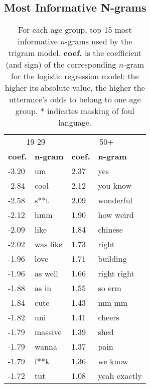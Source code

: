 \subsection{Most Informative N-grams}

\begin{table}[H]
    \centering
    \begin{tabular}{@{}l l @{\hspace*{25pt}} l l@{}}
    \toprule
    \multicolumn{2}{c}{19-29} & \multicolumn{2}{c}{50+}\\
    \textbf{coef.} & \textbf{n-gram} & \textbf{coef.} & \textbf{n-gram}\\
    \midrule
    -3.20 & um & 2.37 & yes\\
    -2.84 & cool & 2.12 & you know\\
    -2.58 & s**t & 2.09 & wonderful\\
    -2.12 & hmm & 1.90 & how weird\\
    -2.09 & like & 1.84 & chinese\\
    -2.02 & was like & 1.73 & right\\
    -1.96 & love & 1.71 & building\\
    -1.96 & as well & 1.66 & right right\\
    -1.88 & as in & 1.55 & so erm\\
    -1.84 & cute & 1.43 & mm mm\\
    -1.82 & uni & 1.41 & cheers\\
    -1.79 & massive & 1.39 & shed\\
    -1.79 & wanna & 1.37 & pain\\
    -1.79 & f**k & 1.36 & we know\\
    -1.72 & tut & 1.08 & yeah exactly\\
    \bottomrule
    \end{tabular}
    \caption{For each age group, top 15 most informative $n$-grams used by the trigram model. \textbf{coef.} is the coefficient (and sign) of the corresponding $n$-gram for the logistic regression model: the higher its absolute value, the higher the utterance's odds to belong to one age group.
    * indicates masking of foul language.}
    \label{tab:top_ngrams_ws}
\end{table}


